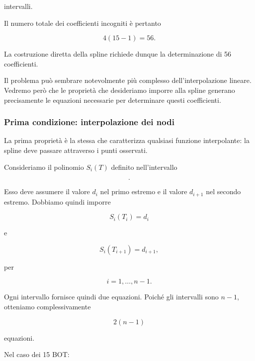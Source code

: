intervalli.

Il numero totale dei coefficienti incogniti è pertanto

\begin{equation*}
    4(15-1)=56.
\end{equation*}

La costruzione diretta della spline richiede dunque la determinazione
di 56 coefficienti.

Il problema può sembrare notevolmente più complesso
dell'interpolazione lineare. Vedremo però che le proprietà che
desideriamo imporre alla spline generano precisamente le equazioni
necessarie per determinare questi coefficienti.


\subsubsection{Prima condizione: interpolazione dei nodi}

La prima proprietà è la stessa che caratterizza qualsiasi funzione
interpolante: la spline deve passare attraverso i punti osservati.

Consideriamo il polinomio $S_i(T)$ definito nell'intervallo

\begin{equation*}
    [T_i,T_{i+1}].
\end{equation*}

Esso deve assumere il valore $d_i$ nel primo estremo e il valore
$d_{i+1}$ nel secondo estremo. Dobbiamo quindi imporre

\begin{equation*}
    S_i(T_i)=d_i
\end{equation*}

e

\begin{equation*}
    S_i(T_{i+1})=d_{i+1},
\end{equation*}

per

\begin{equation*}
    i=1,\ldots,n-1.
\end{equation*}

Ogni intervallo fornisce quindi due equazioni. Poiché gli intervalli
sono $n-1$, otteniamo complessivamente

\begin{equation*}
    2(n-1)
\end{equation*}

equazioni.

Nel caso dei 15 BOT:

